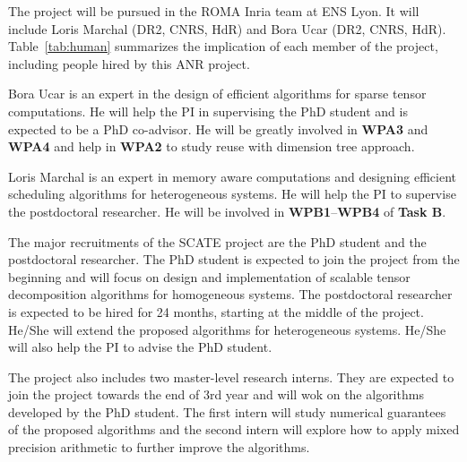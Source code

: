 \documentclass[a4paper,11pt]{article}
\begin{document}
	
	
	The project will be pursued in the ROMA Inria team at ENS Lyon. It will include Loris Marchal (DR2, CNRS, HdR) and Bora Ucar (DR2, CNRS, HdR). Table~\ref{tab:human} summarizes the implication of each member of the project, including people hired by this ANR project.
	
		
	Bora Ucar is an expert in the design of efficient algorithms for sparse tensor computations. He will help the PI in supervising the PhD student and is expected to be a PhD co-advisor. He will be greatly involved in \textbf{WPA3} and \textbf{WPA4} and help in \textbf{WPA2} to study reuse with dimension tree approach.
	
	
	Loris Marchal is an expert in memory aware computations and designing efficient scheduling algorithms for heterogeneous systems. He will help the PI to supervise the postdoctoral researcher. He will be involved in \textbf{WPB1}--\textbf{WPB4} of \textbf{Task B}.
	
	The major recruitments of the SCATE project are the PhD student and the postdoctoral researcher. The PhD student is expected to join the project from the beginning and will focus on design and implementation of scalable tensor decomposition algorithms for homogeneous systems. The postdoctoral researcher is expected to be hired for 24 months, starting at the middle of the project. He/She will extend the proposed algorithms for heterogeneous systems. He/She will also help the PI to advise the PhD student.
	
	The project also includes two master-level research interns. They are expected to join the project towards the end of 3rd year and will wok on the algorithms developed by the PhD student. The first intern will study numerical guarantees of the proposed algorithms and the second intern will explore how to apply mixed precision arithmetic to further improve the algorithms.
			
\end{document}
